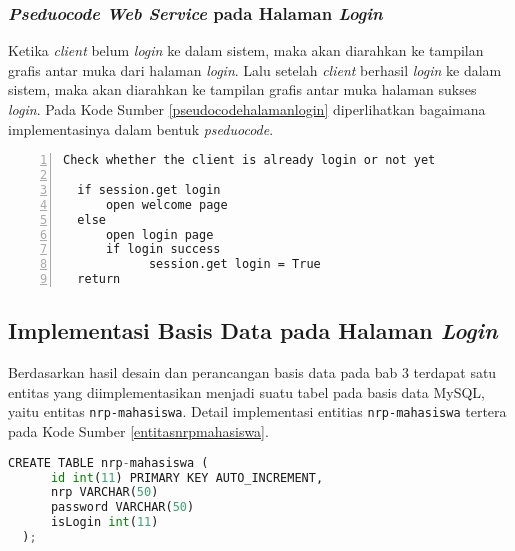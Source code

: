   \subsubsection{\textit{Pseduocode Web Service} pada Halaman \textit{Login}}
  Ketika \textit{client} belum \textit{login} ke dalam sistem, maka akan diarahkan ke tampilan grafis antar muka dari halaman \textit{login}. Lalu setelah \textit{client} berhasil \textit{login} ke dalam sistem, maka akan diarahkan ke tampilan grafis antar muka halaman sukses \textit{login}. Pada Kode Sumber \ref{pseudocodehalamanlogin} diperlihatkan bagaimana implementasinya dalam bentuk \textit{pseduocode}.
  
  \begin{minipage}{\linewidth}  
  \begin{lstlisting}[numbers=left, frame=single,tabsize=2,breaklines,caption={Pseudocode Web Service},label=pseudocodehalamanlogin]
  Check whether the client is already login or not yet
  	
  if session.get login
	  open welcome page
  else
	  open login page
	  if login success
			session.get login = True	  
  return  	
  \end{lstlisting}
  \end{minipage}
  
  
  \subsection{Implementasi Basis Data pada Halaman \textit{Login}}
  Berdasarkan hasil desain dan perancangan basis data pada bab 3 terdapat satu entitas yang diimplementasikan menjadi suatu tabel pada basis data MySQL, yaitu entitas \texttt{nrp-mahasiswa}. Detail implementasi entitias \texttt{nrp-mahasiswa} tertera pada Kode Sumber \ref{entitasnrpmahasiswa}.\\
  \begin{minipage}{\linewidth}
  \begin{lstlisting}[language=python, caption=\textit{Query} untuk membuat tabel testing,label=entitasnrpmahasiswa]
  CREATE TABLE nrp-mahasiswa (
	  id int(11) PRIMARY KEY AUTO_INCREMENT,
	  nrp VARCHAR(50)
	  password VARCHAR(50)
	  isLogin int(11)
  );
  \end{lstlisting}
  \end{minipage}
    
